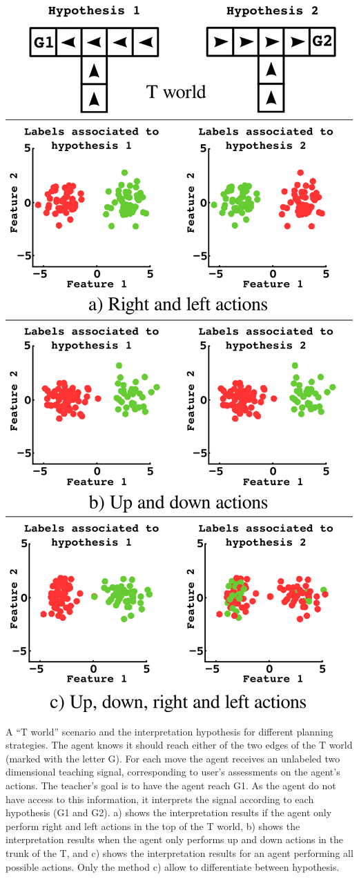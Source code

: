 \documentclass[a0,final, portrait]{inriaposter}
\begin{document}
\begin{multicols}{2}
{\begin{center}
	\includegraphics[width=0.7\columnwidth]{images/planning.png}
\end{center}

{\large A “T world” scenario and the interpretation hypothesis for different planning strategies. The agent knows it should reach either of the two edges of the T world (marked with the letter G). For each move the agent receives an unlabeled two dimensional teaching signal, corresponding to user’s assessments on the agent’s actions. The teacher’s goal is to have the agent reach G1. As the agent do not have access to this information, it interprets the signal according to each hypothesis (G1 and G2). a) shows the interpretation results if the agent only perform right and left actions in the top of the T world, b) shows the interpretation results when the agent only performs up and down actions in the trunk of the T, and c) shows the interpretation results for an agent performing all possible actions. Only the method c) allow to differentiate between hypothesis.}


}
\end{multicols}
\end{document}
